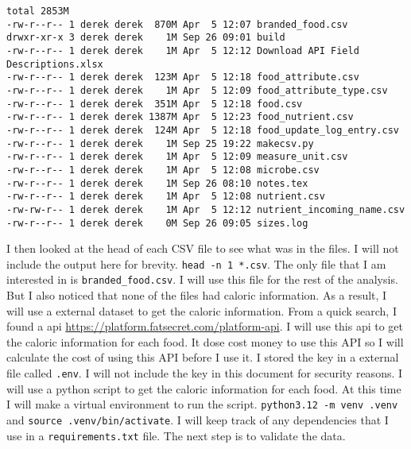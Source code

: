 \documentclass{article}
\begin{document}
\begin{lstlisting}[caption={list the files}, label={lst:list_files}]
total 2853M
-rw-r--r-- 1 derek derek  870M Apr  5 12:07 branded_food.csv
drwxr-xr-x 3 derek derek    1M Sep 26 09:01 build
-rw-r--r-- 1 derek derek    1M Apr  5 12:12 Download API Field Descriptions.xlsx
-rw-r--r-- 1 derek derek  123M Apr  5 12:18 food_attribute.csv
-rw-r--r-- 1 derek derek    1M Apr  5 12:09 food_attribute_type.csv
-rw-r--r-- 1 derek derek  351M Apr  5 12:18 food.csv
-rw-r--r-- 1 derek derek 1387M Apr  5 12:23 food_nutrient.csv
-rw-r--r-- 1 derek derek  124M Apr  5 12:18 food_update_log_entry.csv
-rw-r--r-- 1 derek derek    1M Sep 25 19:22 makecsv.py
-rw-r--r-- 1 derek derek    1M Apr  5 12:09 measure_unit.csv
-rw-r--r-- 1 derek derek    1M Apr  5 12:08 microbe.csv
-rw-r--r-- 1 derek derek    1M Sep 26 08:10 notes.tex
-rw-r--r-- 1 derek derek    1M Apr  5 12:08 nutrient.csv
-rw-rw-r-- 1 derek derek    1M Apr  5 12:12 nutrient_incoming_name.csv
-rw-r--r-- 1 derek derek    0M Sep 26 09:05 sizes.log
\end{lstlisting}
I then looked at the head of each CSV file to see what was in the files. I will not include the output here for brevity. \texttt{head -n 1 *.csv}. The only file that I am interested in is \texttt{branded\_food.csv}. I will use this file for the rest of the analysis. But I also noticed that none of the files had caloric information. As a result, I will use a external dataset to get the caloric information. From a quick search, I found a api \url{https://platform.fatsecret.com/platform-api}. I will use this api to get the caloric information for each food. It dose cost money to use this API so I will calculate the cost of using this API before I use it. I stored the key in a external file called \texttt{.env}. I will not include the key in this document for security reasons. I will use a python script to get the caloric information for each food. At this time I will make a virtual environment to run the script. \texttt{python3.12 -m venv .venv} and \texttt{source .venv/bin/activate}. I will keep track of any dependencies that I use in a \texttt{requirements.txt} file. The next step is to validate the data. 
\end{document}
